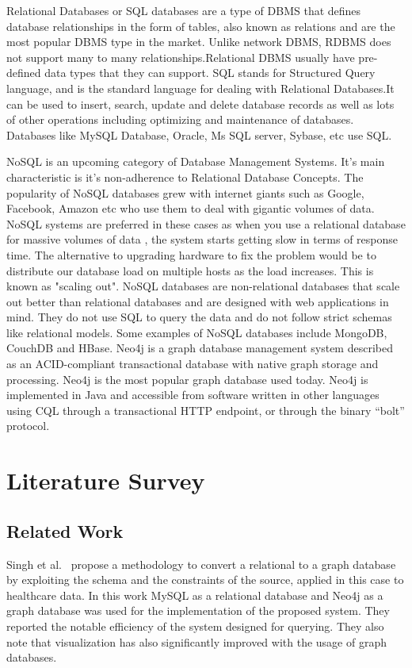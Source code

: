 \documentclass[12pt]{article}
\newcommand{\sectionfontstyle}{\fontsize{16pt}{1em}\usefont{T1}{phv}{b}{n}}
\begin{document}
    Relational Databases or SQL databases are a  type of DBMS that defines database relationships in the form of tables, also known as relations and are the most popular DBMS type in the market. Unlike network DBMS, RDBMS does not support many to many relationships.Relational DBMS usually have pre-defined data types that they can support. SQL stands for Structured Query language, and is the standard language for dealing with Relational Databases.It can be used to insert, search, update and delete database records as well as lots of other operations including optimizing and maintenance of databases. Databases like MySQL Database, Oracle, Ms SQL server, Sybase, etc use SQL.

    NoSQL is an upcoming category of Database Management Systems. It’s main characteristic is it’s non-adherence to Relational Database Concepts. The popularity of NoSQL databases grew with internet giants such as Google, Facebook, Amazon etc who use them to deal with gigantic volumes of data. NoSQL systems are preferred in these cases as when you use a relational database for massive volumes of data , the system starts getting slow in terms of response time. The alternative to upgrading hardware to fix the problem would be to distribute our database load on multiple hosts as the load increases. This is known as "scaling out". NoSQL databases are non-relational databases that scale out better than relational databases and are designed with web applications in mind. They do not use SQL to query the data and do not follow strict schemas like relational models. Some examples of NoSQL databases include MongoDB, CouchDB and HBase.
    Neo4j is a graph database management system described as an ACID-compliant transactional database with native graph storage and processing. Neo4j is the most popular graph database used today. Neo4j is implemented in Java and accessible from software written in other languages using CQL through a transactional HTTP endpoint, or through the binary ``bolt'' protocol.

    \newpage

    \section{\sectionfontstyle Literature Survey}
    \subsection{Related Work}
    Singh et al.~\cite{base_paper} propose a methodology to convert a relational to a graph database by exploiting the schema and the constraints of the source, applied in this case to healthcare data. In this work MySQL as a relational database and Neo4j as a graph database was used for the implementation of the proposed system. They reported the notable efficiency of the system designed for querying. They also note that visualization has also significantly improved with the usage of graph databases.
\end{document}
